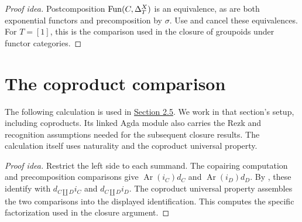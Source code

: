 \documentclass[11pt]{article}
\begin{document}
\begin{proof}[Proof idea]
Postcomposition $\operatorname{Fun}(C,\Delta_T^X)$ is an equivalence, as are both
exponential functors and precomposition by $\sigma$.
Use  and cancel these
equivalences. For $T=[1]$, this is the comparison used in the closure
of groupoids under functor categories.
\end{proof}

\section*{The coproduct comparison}

The following calculation is used in
\href{recognizing-animae.html}{Section 2.5}. We work in that section's
setup, including coproducts. Its linked Agda module also carries the Rezk
and recognition assumptions needed for the subsequent closure results.
The calculation itself uses naturality and the coproduct universal property.

\begin{proof}[Proof idea]
Restrict the left side to each summand. The copairing computation and
precomposition comparisons give $\operatorname{Ar}(i_C)d_C$ and
$\operatorname{Ar}(i_D)d_D$. By ,
these identify with $d_{C\amalg D}i_C$ and $d_{C\amalg D}i_D$.
The coproduct universal property assembles the two comparisons into the
displayed identification. This computes the specific factorization
used in the closure argument.
\end{proof}
\end{document}
